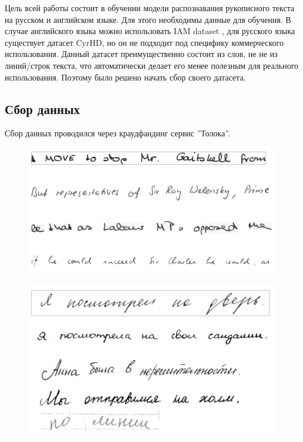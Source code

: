 \documentclass[12pt]{article}
\begin{document}
Цель всей работы состоит в обучении модели распознавания рукописного текста на русском и английском языке. Для
этого необходимы данные для обучения. В случае английского языка можно использовать IAM dataset \cite{iam}, для 
русского языка существует датасет CyrHD, но он не подходит под специфику коммерческого использования.
Данный датасет преимущественно состоит из слов, не не из линий/строк текста, что автоматически делает его менее полезным
для реального использования. Поэтому было решено начать сбор своего датасета.

\subsection{Сбор данных}

Сбор данных проводился через краудфандинг сервис ''Толока''. 

\vspace{10pt}

\begin{figure}[htb]
    \centering
    \begin{minipage}{.55\textwidth}
        \centering
        \includegraphics[width=\linewidth]{IAM.png}
        \label{fig:IAM}
    \end{minipage}%
    \begin{minipage}{.45\textwidth}
        \centering
        \includegraphics[width=\linewidth]{RHD.png}
        \label{fig:RHD}
    \end{minipage}
\end{figure}
\end{document}
